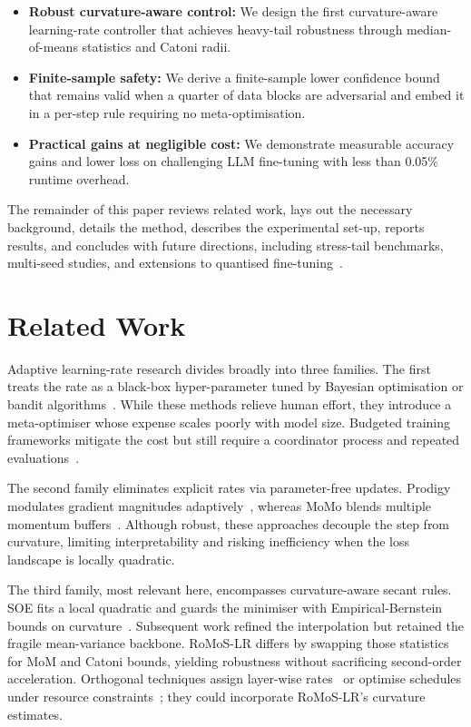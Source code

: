 \documentclass{article} %
\begin{document}
\begin{itemize}
  \item \textbf{Robust curvature-aware control:} We design the first curvature-aware learning-rate controller that achieves heavy-tail robustness through median-of-means statistics and Catoni radii.
  \item \textbf{Finite-sample safety:} We derive a finite-sample lower confidence bound that remains valid when a quarter of data blocks are adversarial and embed it in a per-step rule requiring no meta-optimisation.
  \item \textbf{Practical gains at negligible cost:} We demonstrate measurable accuracy gains and lower loss on challenging LLM fine-tuning with less than 0.05\% runtime overhead.
\end{itemize}

The remainder of this paper reviews related work, lays out the necessary background, details the method, describes the experimental set-up, reports results, and concludes with future directions, including stress-tail benchmarks, multi-seed studies, and extensions to quantised fine-tuning~\cite{author-year-qlora,author-year-evaluating}.

\section{Related Work}\label{sec:related}
Adaptive learning-rate research divides broadly into three families. The first treats the rate as a black-box hyper-parameter tuned by Bayesian optimisation or bandit algorithms~\cite{author-year-autolrs,author-year-bayesian}. While these methods relieve human effort, they introduce a meta-optimiser whose expense scales poorly with model size. Budgeted training frameworks mitigate the cost but still require a coordinator process and repeated evaluations~\cite{author-year-budgeted}.

The second family eliminates explicit rates via parameter-free updates. Prodigy modulates gradient magnitudes adaptively~\cite{author-year-prodigy}, whereas MoMo blends multiple momentum buffers~\cite{author-year-momo}. Although robust, these approaches decouple the step from curvature, limiting interpretability and risking inefficiency when the loss landscape is locally quadratic.

The third family, most relevant here, encompasses curvature-aware secant rules. SOE fits a local quadratic and guards the minimiser with Empirical-Bernstein bounds on curvature~\cite{author-year-stepping}. Subsequent work refined the interpolation but retained the fragile mean-variance backbone. RoMoS-LR differs by swapping those statistics for MoM and Catoni bounds, yielding robustness without sacrificing second-order acceleration. Orthogonal techniques assign layer-wise rates~\cite{author-year-multirate} or optimise schedules under resource constraints~\cite{author-year-budgeted}; they could incorporate RoMoS-LR's curvature estimates.
\end{document}
